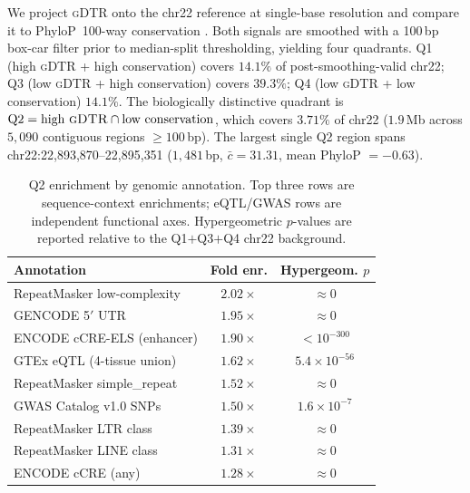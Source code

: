 \documentclass{article}
\theoremstyle{plain}
\theoremstyle{definition}
\theoremstyle{remark}
\newcommand{\gDTR}{\textsc{gDTR}}
\begin{document}
We project \gDTR{} onto the chr22 reference at single-base resolution
and compare it to PhyloP~100-way conservation \cite{pollard2010phylop}.
Both signals are smoothed with a 100\,bp box-car filter prior to
median-split thresholding, yielding four quadrants. Q1 (high \gDTR{} +
high conservation) covers $14.1\%$ of post-smoothing-valid chr22; Q3
(low \gDTR{} + high conservation) covers $39.3\%$; Q4 (low \gDTR{} +
low conservation) $14.1\%$. The biologically distinctive quadrant is
$\mathrm{Q2} = \text{high \gDTR{}} \cap \text{low conservation}$, which
covers $3.71\%$ of chr22 ($1.9$\,Mb across $5{,}090$ contiguous regions
$\ge 100$\,bp). The largest single Q2 region spans
chr22:22{,}893{,}870--22{,}895{,}351 ($1{,}481$\,bp, $\bar{c}=31.31$,
mean PhyloP $=-0.63$).

\begin{table}[t]
\caption{Q2 enrichment by genomic annotation. Top three rows are
sequence-context enrichments; eQTL/GWAS rows are independent functional
axes. Hypergeometric $p$-values are reported relative to the Q1$+$Q3$+$Q4
chr22 background.}
\label{tab:q2}
\centering
\small
\begin{tabular}{@{}lcc@{}}
\toprule
Annotation & Fold enr. & Hypergeom. $p$ \\
\midrule
RepeatMasker low-complexity   & $2.02\times$ & $\approx 0$ \\
GENCODE 5$'$ UTR              & $1.95\times$ & $\approx 0$ \\
ENCODE cCRE-ELS (enhancer)    & $1.90\times$ & $< 10^{-300}$ \\
GTEx eQTL (4-tissue union)    & $1.62\times$ & $5.4\times 10^{-56}$ \\
RepeatMasker simple\_repeat   & $1.52\times$ & $\approx 0$ \\
GWAS Catalog v1.0 SNPs        & $1.50\times$ & $1.6\times 10^{-7}$ \\
RepeatMasker LTR class        & $1.39\times$ & $\approx 0$ \\
RepeatMasker LINE class       & $1.31\times$ & $\approx 0$ \\
ENCODE cCRE (any)             & $1.28\times$ & $\approx 0$ \\
\bottomrule
\end{tabular}
\end{table}
\end{document}
